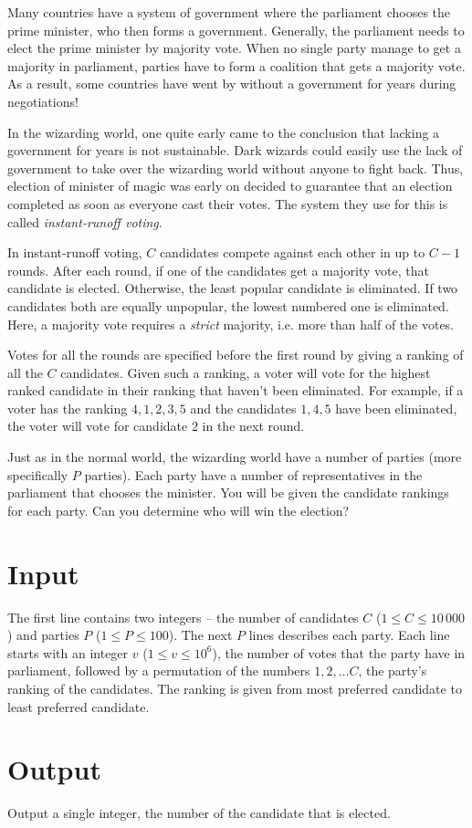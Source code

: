 
\noindent
Many countries have a system of government where the parliament chooses the prime minister, who then forms a government.
Generally, the parliament needs to elect the prime minister by majority vote.
When no single party manage to get a majority in parliament, parties have to form a coalition that gets a majority vote.
As a result, some countries have went by without a government for years during negotiations!

In the wizarding world, one quite early came to the conclusion that lacking a government for years is not sustainable.
Dark wizards could easily use the lack of government to take over the wizarding world without anyone to fight back.
Thus, election of minister of magic was early on decided to guarantee that an election completed as soon as everyone cast their votes.
The system they use for this is called \emph{instant-runoff voting}.

In instant-runoff voting, $C$ candidates compete against each other in up to $C - 1$ rounds.
After each round, if one of the candidates get a majority vote, that candidate is elected.
Otherwise, the least popular candidate is eliminated.
If two candidates both are equally unpopular, the lowest numbered one is eliminated.
Here, a majority vote requires a \emph{strict} majority, i.e. more than half of the votes.

Votes for all the rounds are specified before the first round by giving a ranking of all the $C$ candidates.
Given such a ranking, a voter will vote for the highest ranked candidate in their ranking that haven't been eliminated.
For example, if a voter has the ranking $4, 1, 2, 3, 5$ and the candidates $1, 4, 5$ have been eliminated, the voter will vote for candidate $2$ in the next round.

Just as in the normal world, the wizarding world have a number of parties (more specifically $P$ parties).
Each party have a number of representatives in the parliament that chooses the minister.
You will be given the candidate rankings for each party.
Can you determine who will win the election?

\section*{Input}
The first line contains two integers -- the number of candidates $C$ ($1 \le C \le 10\,000$) and parties $P$ ($1 \le P \le 100$).
The next $P$ lines describes each party.
Each line starts with an integer $v$ ($1 \le v \le 10^6$), the number of votes that the party have in parliament, followed by a permutation of the numbers $1, 2, \dots C$, the party's ranking of the candidates.
The ranking is given from most preferred candidate to least preferred candidate.

\section*{Output}
Output a single integer, the number of the candidate that is elected.
